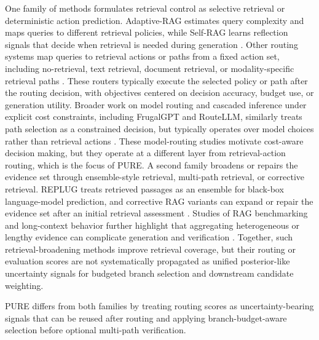 \documentclass[a4paper,fleqn]{cas-dc}
\begin{document}
One family of methods formulates retrieval control as selective retrieval or deterministic action prediction. 
Adaptive-RAG estimates query complexity and maps queries to different retrieval policies, while Self-RAG learns reflection signals that decide when retrieval is needed during generation \citep{Jeong2024AdaptiveRAG,Asai2023SelfRAG}. 
Other routing systems map queries to retrieval actions or paths from a fixed action set, including no-retrieval, text retrieval, document retrieval, or modality-specific retrieval paths \citep{Mallen2023Trust,Yeo2026UniversalRAG}. 
These routers typically execute the selected policy or path after the routing decision, with objectives centered on decision accuracy, budget use, or generation utility.
Broader work on model routing and cascaded inference under explicit cost constraints, including FrugalGPT and RouteLLM, similarly treats path selection as a constrained decision, but typically operates over model choices rather than retrieval actions \citep{Chen2024FrugalGPT,Ong2025RouteLLM}. These model-routing studies motivate cost-aware decision making, but they operate at a different layer from retrieval-action routing, which is the focus of PURE.
A second family broadens or repairs the evidence set through ensemble-style retrieval, multi-path retrieval, or corrective retrieval. 
REPLUG treats retrieved passages as an ensemble for black-box language-model prediction, and corrective RAG variants can expand or repair the evidence set after an initial retrieval assessment \citep{Shi2024REPLUG,Yan2024CorrectiveRAG}. 
Studies of RAG benchmarking and long-context behavior further highlight that aggregating heterogeneous or lengthy evidence can complicate generation and verification \citep{Chen2024Benchmarking,Liu2024LostMiddle}. 
Together, such retrieval-broadening methods improve retrieval coverage, but their routing or evaluation scores are not systematically propagated as unified posterior-like uncertainty signals for budgeted branch selection and downstream candidate weighting.

PURE differs from both families by treating routing scores as uncertainty-bearing signals that can be reused after routing and applying branch-budget-aware selection before optional multi-path verification.
\end{document}

